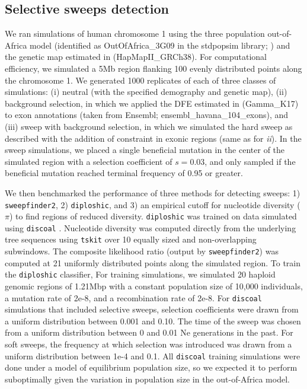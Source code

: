 \documentclass[hidelinks]{article}
\newcommand{\tskit}{\texttt{tskit}\xspace}
\newcommand{\sweepfinder}{\texttt{sweepfinder2}\xspace}
\newcommand{\diploshic}{\texttt{diploshic}\xspace}
\begin{document}
    \subsection*{Selective sweeps detection}
    We ran simulations of human chromosome 1 using the three population out-of-Africa model
    (identified as OutOfAfrica\_3G09 in the stdpopsim library; \cite{gutenkunst2009inferring})
    and the genetic map estimated in \citet{international2007second} (HapMapII\_GRCh38).
    For computational efficiency, we simulated a 5Mb region flanking 100 evenly distributed points along the chromosome 1.
    We generated 1000 replicates of each of three classes of simulations:
    (i) neutral (with the specified demography and genetic map),
    (ii) background selection, in which we applied the DFE estimated in \citet{kim2017inference} (Gamma\_K17) to exon annotations (taken from Ensembl; ensembl\_havana\_104\_exons),
    and (iii) sweep with background selection, in which we simulated the hard sweep as described with the addition of constraint in exonic regions (same as for \emph{ii}).
    In the sweep simulations, we placed a single beneficial mutation in the center of the simulated region with a selection coefficient of $s = 0.03$, and only sampled if the beneficial mutation reached terminal frequency of 0.95 or greater.

    We then benchmarked the performance of three methods for detecting sweeps: 1) \sweepfinder \citep{degiorgio2016sweepfinder2},
    2) \diploshic \citep{kern2018diplos}, and 3) an empirical cutoff for nucleotide diversity ($\pi$) to find regions of reduced diversity.
    \diploshic was trained on data simulated using \texttt{discoal} \citep{kern2016discoal}.
    Nucleotide diversity was computed directly from the underlying tree sequences using \tskit \citep{ralph2020efficiently} over 10 equally sized and non-overlapping subwindows.
    The composite likelihood ratio (output by \sweepfinder) was computed at 21 uniformly distributed points along the simulated region.
    To train the \diploshic classifier, 
    For training simulations, we simulated 20 haploid genomic regions of 1.21Mbp
    with a constant population size of 10,000 individuals, a mutation rate of 2e-8, and a recombination rate of 2e-8.
    For \texttt{discoal} simulations that included selective sweeps,
    selection coefficients were drawn from a uniform distribution between 0.001 and 0.10.
    The time of the sweep was chosen from a uniform distribution between 0 and 0.01 Ne generations in the past.
    For soft sweeps, the frequency at which selection was introduced was drawn from a uniform distribution between 1e-4 and 0.1.
    All \texttt{discoal} training simulations were done under a model of equilibrium population size, 
    so we expected it to perform suboptimally given the variation in population size in the out-of-Africa model.
\end{document}

